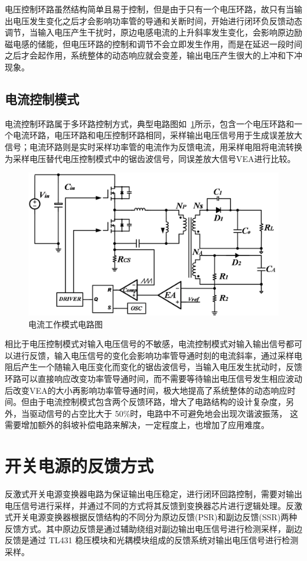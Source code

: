 电压控制环路虽然结构简单且易于控制，但是由于只有一个电压环路，故只有当输出电压发生变化之后才会影响功率管的导通和关断时间，开始进行闭环负反馈动态调节，当输入电压产生干扰时，原边电感电流的上升斜率发生变化，会影响原边励磁电感的储能，但电压环路的控制和调节不会立即发生作用，而是在延迟一段时间之后才会起作用，系统整体的动态响应就会变差，输出电压产生很大的上冲和下冲现象。

\subsection{电流控制模式}

电流控制环路属于多环路控制方式，典型电路图如~\ref{fig:电流工作模式电路图}所示，包含一个电压环路和一个电流环路，电压环路和电压控制环路相同，采样输出电压信号用于生成误差放大信号；电流环路则是实时采样功率管的电流作为反馈电流，用采样电阻将电流转换为采样电压替代电压控制模式中的锯齿波信号，同误差放大信号VEA进行比较。

\begin{figure}[htbp] 
    \centering
    \includegraphics[width=0.8\linewidth]{figures/电流工作模式电路图.png}
    \caption{电流工作模式电路图}
    \label{fig:电流工作模式电路图}
\end{figure}

相比于电压控制模式对输入电压信号的不敏感，电流控制模式对输入输出信号都可以进行反馈，输入电压信号的变化会影响功率管导通时刻的电流斜率，通过采样电阻后产生一个随输入电压变化而变化的锯齿波信号，当输入电压发生扰动时，反馈环路可以直接响应改变功率管导通时间，而不需要等待输出电压信号发生相应波动后改变VEA的大小再影响功率管导通时间，极大地提高了系统整体的动态响应时间。但由于电流控制模式包含两个反馈环路，增大了电路结构的设计复杂度，另外，当驱动信号的占空比大于 50\%时，电路中不可避免地会出现次谐波振荡， 这需要增加额外的斜坡补偿电路来解决，一定程度上，也增加了应用难度。

 
\section{开关电源的反馈方式}
反激式开关电源变换器电路为保证输出电压稳定，进行闭环回路控制，需要对输出电压信号进行采样，并通过不同的方式将其反馈到变换器芯片进行逻辑处理。反激式开关电源变换器根据反馈结构的不同分为原边反馈(PSR)和副边反馈(SSR)两种反馈方式。其中原边反馈是通过辅助绕组对副边输出电压信号进行检测采样，副边反馈是通过 TL431 稳压模块和光耦模块组成的反馈系统对输出电压信号进行检测采样。

